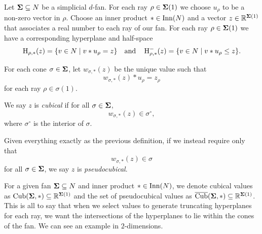 \documentclass[12pt,oneside]{../../sfsuthesis}
\begin{document}
\begin{definition}\th\label{def:cubical}
    Let \( \bm{\Sigma} \subseteq N \) be a simplicial \( d \)-fan.
    For each ray \( \rho \in \bm{\Sigma}(1) \) we choose \( u_\rho \) to be a non-zero vector in \( \rho \).
    Choose an inner product \( \ast \in \operatorname{Inn}(N) \) and a vector \( z \in \mathbb{R}^{\bm{\Sigma}(1)} \) that associates a real number to each ray of our fan.
    For each ray \( \rho \in \bm{\Sigma}(1) \) we have a corresponding hyperplane and half-space
    \[
        \operatorname{H}_{\rho, \ast}(z) = \{ v \in N \; | \; v \ast u_\rho = z \}
        \quad \text{and} \quad
        \operatorname{H}^{-}_{\rho, \ast}(z) = \{ v \in N \; | \; v \ast u_\rho \leq z \}.
    \]

    For each cone \( \sigma \in \bm{\Sigma} \), let \( w_{\sigma,\ast}(z) \) be the unique value such that
    \[
        w_{\sigma,\ast}(z) \ast u_\rho = z_\rho
    \]
    for each ray \(\rho \in \sigma(1)\).

    We say \( z \) is \emph{cubical} if for all \( \sigma \in \bm{\Sigma} \),
    \[
        w_{\sigma, \ast}(z)  \in \sigma^\circ,
    \]
    where \( \sigma^\circ \) is the interior of \( \sigma \).
\end{definition}
\begin{definition}[Pseudocubical]\th\label{def:pseudocubical}
    Given everything exactly as the previous definition, if we instead require only that
    \[
        w_{\sigma, \ast}(z) \in \sigma
    \]
    for all \( \sigma \in \bm{\Sigma} \), we say \( z \) is \emph{pseudocubical}.
\end{definition}
For a given fan \( \bm{\Sigma} \subseteq N \) and inner product \( \ast \in \operatorname{Inn}(N) \), we denote cubical values as \( \operatorname{Cub}(\bm{\Sigma}, \ast) \subseteq \mathbb{R}^{\bm{\Sigma}(1)} \) and the set of pseudocubical values as \( \operatorname{\overline{Cub}}(\bm{\Sigma}, \ast) \subseteq \mathbb{R}^{\bm{\Sigma}(1)} \).
This is all to say that when we select values to generate truncating hyperplanes for each ray, we want the intersections of the hyperplanes to lie within the cones of the fan.
We can see an example in \( 2 \)-dimensions.
\end{document}
